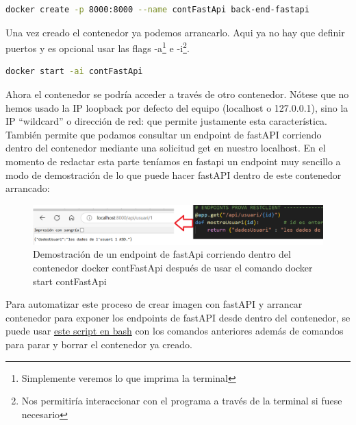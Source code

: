 \documentclass[a4paper,12pt]{report}
\begin{document}
	\begin{lstlisting}[language=bash]
docker create -p 8000:8000 --name contFastApi back-end-fastapi
	\end{lstlisting}

	
	Una vez creado el contenedor ya podemos arrancarlo. Aqui ya no hay que definir puertos y es opcional usar las flags -a\footnote{Simplemente veremos lo que imprima la terminal} e -i\footnote{Nos permitiría interaccionar con el programa a través de la terminal si fuese necesario}.
	
	\begin{lstlisting}[language=bash]
		docker start -ai contFastApi
	\end{lstlisting}
	
	
	Ahora el contenedor se podría acceder a través de otro contenedor. Nótese que no hemos usado la IP loopback por defecto del equipo (localhost o 127.0.0.1), sino la IP ``wildcard'' o dirección de red: que permite justamente esta característica. También permite que podamos consultar un endpoint de fastAPI corriendo dentro del contenedor mediante una solicitud get en nuestro localhost. En el momento de redactar esta parte teníamos en fastapi un endpoint muy sencillo a modo de demostración de lo que puede hacer fastAPI dentro de este contenedor arrancado:
	
	\FloatBarrier
	\begin{figure}[H]
		\centering
		\caption{Demostración de un endpoint de fastApi corriendo dentro del contenedor docker contFastApi después de usar el comando docker start contFastApi}
		\label{fig:demofastapiendpointdummy}
		\includegraphics[width=1\linewidth]{img/demoFastApiEndpointDummy}
	\end{figure}
	\FloatBarrier
	
	Para automatizar este proceso de crear imagen con fastAPI y arrancar contenedor para exponer los endpoints de fastAPI desde dentro del contenedor, se puede usar \href{https://github.com/blackcub3s/mercApp/blob/main/APP%20WEB/__FastAPI__/creaImatge_i_arrancaContenidor.sh}{este script en bash} con los comandos anteriores además de comandos para parar y borrar el contenedor ya creado.
	
	
	
	
	
	
	
\end{document}
